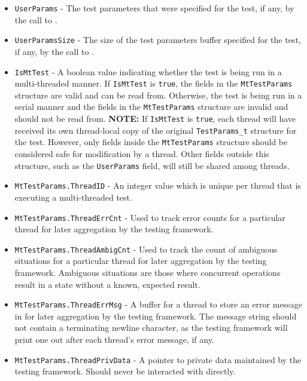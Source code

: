 \documentclass[../HDF5_RFC.tex]{subfiles}
\begin{document}
\begin{itemize}
    \item \texttt{UserParams} - The test parameters that were specified for the test, if any, by the
          call to .
    \item \texttt{UserParamsSize} - The size of the test parameters buffer specified for the test, if
          any, by the call to .
    \item \texttt{IsMtTest} - A boolean value indicating whether the test is being run in a
          multi-threaded manner. If \texttt{IsMtTest} is \texttt{true}, the fields in the
          \texttt{MtTestParams} structure are valid and can be read from. Otherwise, the test is being
          run in a serial manner and the fields in the \texttt{MtTestParams} structure are invalid and
          should not be read from. \textbf{NOTE:} If \texttt{IsMtTest} is \texttt{true}, each thread
          will have received its own thread-local copy of the original \texttt{TestParams\_t} structure
          for the test. However, only fields inside the \texttt{MtTestParams} structure should be
          considered safe for modification by a thread. Other fields outside this structure, such as
          the \texttt{UserParams} field, will still be shared among threads.
    \item \texttt{MtTestParams.ThreadID} - An integer value which is unique per thread that is executing
          a multi-threaded test.
    \item \texttt{MtTestParams.ThreadErrCnt} - Used to track error counts for a particular thread for
          later aggregation by the testing framework.
    \item \texttt{MtTestParams.ThreadAmbigCnt} - Used to track the count of ambiguous situations for a
          particular thread for later aggregation by the testing framework. Ambiguous situations are
          those where concurrent operations result in a state without a known, expected result.
    \item \texttt{MtTestParams.ThreadErrMsg} - A buffer for a thread to store an error message in for
          later aggregation by the testing framework. The message string should not contain a terminating
          newline character, as the testing framework will print one out after each thread's error message,
          if any.
    \item \texttt{MtTestParams.ThreadPrivData} - A pointer to private data maintained by the testing
          framework. Should never be interacted with directly.
\end{itemize}
\end{document}
